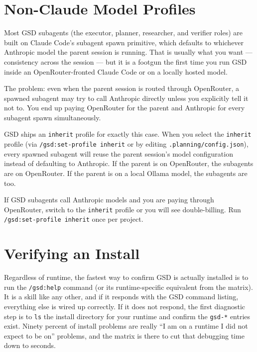 \documentclass[11pt,letterpaper,openany]{book}
\begin{document}
\section{Non-Claude Model Profiles}

Most GSD subagents (the executor, planner, researcher, and verifier
roles) are built on Claude Code's subagent spawn primitive, which
defaults to whichever Anthropic model the parent session is running.
That is usually what you want --- consistency across the session --- but
it is a footgun the first time you run GSD inside an OpenRouter-fronted
Claude Code or on a locally hosted model.

The problem: even when the parent session is routed through OpenRouter,
a spawned subagent may try to call Anthropic directly unless you
explicitly tell it not to. You end up paying OpenRouter for the parent
and Anthropic for every subagent spawn simultaneously.

GSD ships an \texttt{inherit} profile for exactly this case. When you
select the \texttt{inherit} profile (via \texttt{/gsd:set-profile
inherit} or by editing \texttt{.planning/config.json}), every spawned
subagent will reuse the parent session's model configuration instead of
defaulting to Anthropic. If the parent is on OpenRouter, the subagents
are on OpenRouter. If the parent is on a local Ollama model, the
subagents are too.

\begin{gsdimportant}
If GSD subagents call Anthropic models and you are paying through
OpenRouter, switch to the \texttt{inherit} profile or you will see
double-billing. Run \texttt{/gsd:set-profile inherit} once per project.
\end{gsdimportant}

\section{Verifying an Install}

Regardless of runtime, the fastest way to confirm GSD is actually
installed is to run the \texttt{/gsd:help} command (or its runtime-specific
equivalent from the matrix). It is a skill like any other, and if it
responds with the GSD command listing, everything else is wired up
correctly. If it does not respond, the first diagnostic step is to
\texttt{ls} the install directory for your runtime and confirm the
\texttt{gsd-*} entries exist. Ninety percent of install problems are
really ``I am on a runtime I did not expect to be on'' problems, and the
matrix is there to cut that debugging time down to seconds.
\end{document}
